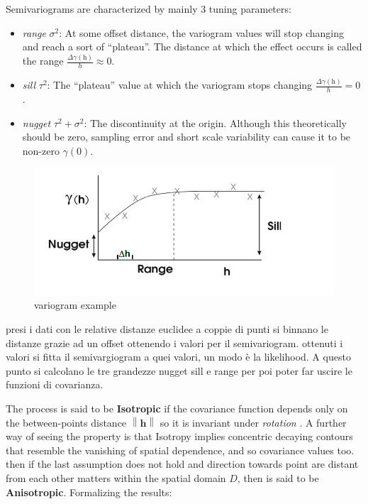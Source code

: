 \documentclass[
  12pt,
  a4paper,
  oneside]{book}
\providecommand{\tightlist}{%
  \setlength{\itemsep}{0pt}\setlength{\parskip}{0pt}}
\theoremstyle{definition}
\theoremstyle{definition}
\theoremstyle{definition}
\theoremstyle{remark}
\begin{document}
Semivariograms are characterized by mainly 3 tuning parameters:

\begin{itemize}
\tightlist
\item
  \emph{range} \(\sigma^{2}\): At some offset distance, the variogram values will stop changing and reach a sort of ``plateau''. The distance at which the effect occurs is called the range \(\frac{\Delta\gamma(\mathrm{h})}{h} \approx 0\).
\item
  \emph{sill} \(\tau^{2}\): The ``plateau'' value at which the variogram stops changing \(\frac{\Delta\gamma(\mathrm{h})}{h} = 0\).
\item
  \emph{nugget} \(\tau^{2}+\sigma^{2}\): The discontinuity at the origin. Although this theoretically should be zero, sampling error and short scale variability can cause it to be non-zero \(\gamma(\mathrm{0})\).
\end{itemize}

\begin{figure}
\centering
\includegraphics{images/variogram.png}
\caption{variogram example}
\end{figure}

presi i dati con le relative distanze euclidee a coppie di punti si binnano le distanze grazie ad un offset ottenendo i valori per il semivariogram. ottenuti i valori si fitta il semivargiogram a quei valori, un modo è la likelihood. A questo punto si calcolano le tre grandezze nugget sill e range per poi poter far uscire le funzioni di covarianza.

The process is said to be \textbf{Isotropic} if the covariance function depends only on the between-points distance \(\left\|\mathbf{h}\right\|\) so it is invariant under \emph{rotation} \citeyearpar{Krainski-Rubio}. A further way of seeing the property is that Isotropy implies concentric decaying contours that resemble the vanishing of spatial dependence, and so covariance values too.
then if the last assumption does not hold and direction towards point are distant from each other matters within the spatial domain \(D\), then is said to be \textbf{Anisotropic}.
Formalizing the results:
\end{document}
